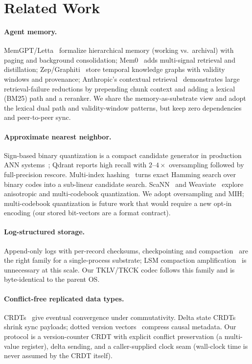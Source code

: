 \documentclass[11pt,twocolumn]{article}
\begin{document}
\section{Related Work}
\label{sec:related}

\paragraph{Agent memory.}
MemGPT/Letta~\cite{memgpt,letta} formalize hierarchical memory (working vs.\
archival) with paging and background consolidation; Mem0~\cite{mem0} adds
multi-signal retrieval and distillation; Zep/Graphiti~\cite{graphiti} store
temporal knowledge graphs with validity windows and provenance; Anthropic's
contextual retrieval~\cite{contextual} demonstrates large retrieval-failure
reductions by prepending chunk context and adding a lexical (BM25) path and a
reranker. We share the memory-as-substrate view and adopt the lexical dual
path and validity-window patterns, but keep zero dependencies and peer-to-peer
sync.

\paragraph{Approximate nearest neighbor.}
Sign-based binary quantization is a compact candidate generator in
production ANN systems~\cite{qdrantbq}; Qdrant reports high recall with
$2$--$4\times$ oversampling followed by full-precision rescore. Multi-index
hashing~\cite{mih} turns exact Hamming search over binary codes into a
sub-linear candidate search. ScaNN~\cite{scann} and Weaviate~\cite{weaviate}
explore anisotropic and multi-codebook quantization. We adopt oversampling and
MIH; multi-codebook quantization is future work that would require a new
opt-in encoding (our stored bit-vectors are a format contract).

\paragraph{Log-structured storage.}
Append-only logs with per-record checksums, checkpointing and
compaction~\cite{bitcask,sqlitewal} are the right family for a single-process
substrate; LSM compaction amplification~\cite{rocksdb} is unnecessary at this
scale. Our TKLV/TKCK codec follows this family and is byte-identical to the
parent OS.

\paragraph{Conflict-free replicated data types.}
CRDTs~\cite{shapiro} give eventual convergence under commutativity. Delta
state CRDTs~\cite{delta} shrink sync payloads; dotted version
vectors~\cite{dvv} compress causal metadata. Our protocol is a version-counter
CRDT with explicit conflict preservation (a multi-value register), delta
sending, and a caller-supplied clock seam (wall-clock time is never assumed by
the CRDT itself).
\end{document}

